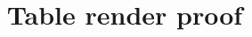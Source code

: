 \documentclass[]{trbunofficial}
\title{Table render proof}
\begin{document}
\nolinenumbers

\clearpage

\end{document}
